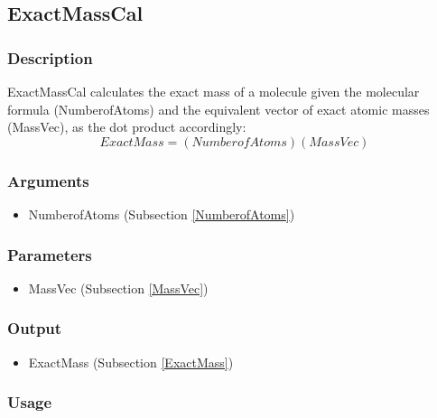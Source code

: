\subsection{ExactMassCal}\label{ExactMassCal}
\subsubsection{Description}
ExactMassCal calculates the exact mass of a molecule given the molecular formula (NumberofAtoms) and the equivalent vector of exact atomic masses (MassVec), as the dot product accordingly:
\begin{equation}
ExactMass=\left(NumberofAtoms\right)\left(MassVec\right)
\end{equation}

\subsubsection{Arguments}
\begin{itemize}
\item NumberofAtoms (Subsection \ref{NumberofAtoms})
\end{itemize}

\subsubsection{Parameters}
\begin{itemize}
\item MassVec (Subsection \ref{MassVec})
\end{itemize}

\subsubsection{Output}
\begin{itemize}
\item ExactMass (Subsection \ref{ExactMass})
\end{itemize}

\subsubsection{Usage}




